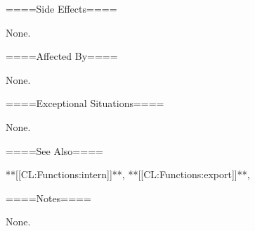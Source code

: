 ====Side Effects====

None.

====Affected By====

None.

====Exceptional Situations====

None.

====See Also====

**[[CL:Functions:intern]]**, **[[CL:Functions:export]]**,

{\secref\TraversalRules}


====Notes====

None.

    
